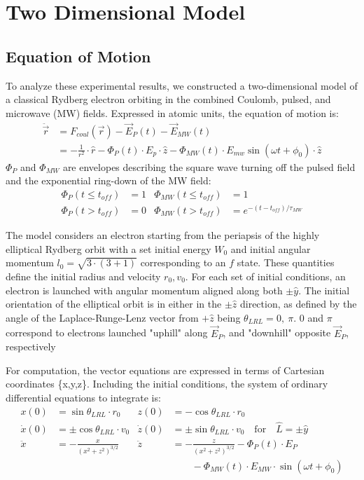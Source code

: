\documentclass[aps,pra,preprint,groupedaddress]{revtex4-1}
\begin{document}
\section{\label{sec:2DMod} Two Dimensional Model}

\subsection{\label{sec:EoM} Equation of Motion}

To analyze these experimental results, we constructed a two-dimensional model of a classical Rydberg electron orbiting in the combined Coulomb, pulsed, and microwave (MW) fields. Expressed in atomic units, the equation of motion is:
\begin{align*}
\ddot{\vec{r}} & = F_{coul}(\vec{r}) - \vec{E}_{P}(t) - \vec{E}_{MW}(t) \\
 & = -\frac{1}{r^2} \cdot \hat{r} - \Phi_P(t) \cdot E_{p} \cdot \hat{z} - \Phi_{MW}(t) \cdot E_{mw} \sin{(\omega t + \phi_0)} \cdot \hat{z} 
\end{align*}
$\Phi_P$ and $\Phi_{MW}$ are envelopes describing the square wave turning off the pulsed field and the exponential ring-down of the MW field:
\begin{align*}
\Phi_P(t \leq t_{off}) & = 1 & \Phi_{MW}(t \leq t_{off}) & = 1 \\
\Phi_P(t > t_{off}) & = 0 & \Phi_{MW}(t > t_{off}) & = e^{-(t-t_{off})/\tau_{MW}}
\end{align*}


The model considers an electron starting from the periapsis of the highly elliptical Rydberg orbit with a set initial energy $W_0$ and initial angular momentum $l_0 = \sqrt{3 \cdot (3+1)}$ corresponding to an $f$ state. These quantities define the initial radius and velocity $r_0, v_0$. For each set of initial conditions, an electron is launched with angular momentum aligned along both $\pm \hat{y}$. The initial orientation of the elliptical orbit is in either in the $\pm \hat{z}$ direction, as defined by the angle of the Laplace-Runge-Lenz vector from $+ \hat{z}$ being $\theta_{LRL} = 0, ~ \pi$. 0 and $\pi$ correspond to electrons launched "uphill" along $\vec{E}_P$, and "downhill" opposite $\vec{E}_P$, respectively

For computation, the vector equations are expressed in terms of Cartesian coordinates \{x,y,z\}. Including the initial conditions, the system of ordinary differential equations to integrate is:
\begin{align*}
x(0) & = \sin{\theta_{LRL}} \cdot r_0 & z(0) & = -\cos{\theta_{LRL}} \cdot r_0 \\
\dot{x}(0) & = \pm \cos{\theta_{LRL}} \cdot v_0 & \dot{z}(0) & = \pm \sin{\theta_{LRL}} \cdot v_0 \quad \text{for} \quad \hat{L} = \pm \hat{y} \\
\ddot{x} & = -\frac{x}{(x^2 + z^2)^{3/2}} & \ddot{z} & = -\frac{z}{(x^2 + z^2)^{3/2}} - \Phi_P(t) \cdot E_P \\
 & & & \quad \quad - \Phi_{MW}(t) \cdot E_{MW} \cdot \sin{(\omega t + \phi_0)}
\end{align*}
\end{document}
